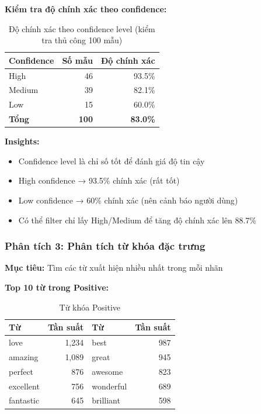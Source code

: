 \textbf{Kiểm tra độ chính xác theo confidence:}
\begin{table}[H]
\centering
\caption{Độ chính xác theo confidence level (kiểm tra thủ công 100 mẫu)}
\begin{tabular}{|l|r|r|}
\hline
\textbf{Confidence} & \textbf{Số mẫu} & \textbf{Độ chính xác} \\
\hline
High & 46 & 93.5\% \\
\hline
Medium & 39 & 82.1\% \\
\hline
Low & 15 & 60.0\% \\
\hline
\textbf{Tổng} & \textbf{100} & \textbf{83.0\%} \\
\hline
\end{tabular}
\end{table}

\textbf{Insights:}
\begin{itemize}
    \item Confidence level là chỉ số tốt để đánh giá độ tin cậy
    \item High confidence → 93.5\% chính xác (rất tốt)
    \item Low confidence → 60\% chính xác (nên cảnh báo người dùng)
    \item Có thể filter chỉ lấy High/Medium để tăng độ chính xác lên 88.7\%
\end{itemize}

\subsubsection{Phân tích 3: Phân tích từ khóa đặc trưng}

\textbf{Mục tiêu:} Tìm các từ xuất hiện nhiều nhất trong mỗi nhãn

\textbf{Top 10 từ trong Positive:}
\begin{table}[H]
\centering
\caption{Từ khóa Positive}
\begin{tabular}{|l|r|l|r|}
\hline
\textbf{Từ} & \textbf{Tần suất} & \textbf{Từ} & \textbf{Tần suất} \\
\hline
love & 1,234 & best & 987 \\
\hline
amazing & 1,089 & great & 945 \\
\hline
perfect & 876 & awesome & 823 \\
\hline
excellent & 756 & wonderful & 689 \\
\hline
fantastic & 645 & brilliant & 598 \\
\hline
\end{tabular}
\end{table}

